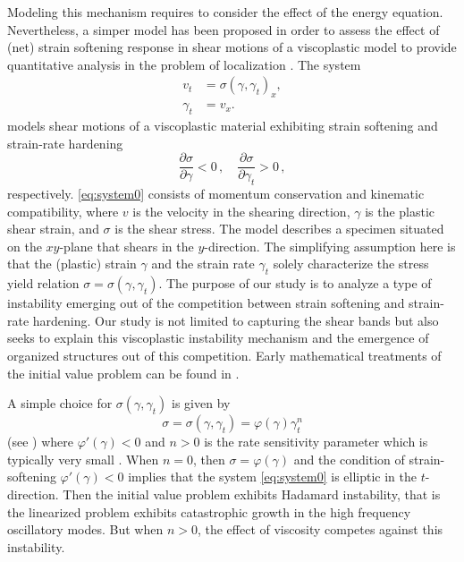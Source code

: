 \documentclass[a4paper,11pt]{article}
\numberwithin{step}{dummy}
\begin{document}
Modeling this mechanism requires to consider the effect of the energy equation. Nevertheless, a simper model has been proposed in order to
assess the effect of (net) strain softening
response in shear motions of a  viscoplastic model  to provide quantitative analysis in the problem of
localization \cite{HN77,tzavaras_plastic_1986,tzavaras_nonlinear_1992}. The system 
\begin{equation} \label{eq:system0}
 \begin{aligned}
   v_t &= \sigma(\gamma,\gamma_t)_x, \\ %
   \gamma_t&=v_x.
 \end{aligned}
\end{equation}
models shear motions of a viscoplastic material exhibiting strain softening  and strain-rate hardening
$$
 \frac{\partial\sigma}{\partial\gamma}<0 \, , \quad   \frac{\partial\sigma}{\partial \gamma_t } > 0 \, , 
$$
respectively. 
\eqref{eq:system0} consists of momentum conservation and kinematic compatibility, where $v$ is the velocity in the shearing direction, 
$\gamma$ is the plastic shear strain,  and $\sigma$ is the shear stress. The model describes a specimen situated on the  $xy$-plane that shears in the $y$-direction. 
The simplifying assumption here is that the (plastic) strain $\gamma$ and the strain rate $\gamma_t$ solely characterize the stress yield relation
$ \sigma = \sigma(\gamma,\gamma_t)$.  The purpose of our study is to analyze a type of instability emerging out of the competition between 
strain softening and strain-rate hardening. Our study is not limited to capturing the shear bands but also seeks to explain this viscoplastic instability mechanism
and the emergence of organized structures out of this competition.
Early mathematical treatments of the initial value problem can be found in \cite{tzavaras_plastic_1986,tzavaras_strain_1991}.

A simple choice for $\sigma(\gamma,\gamma_t)$  is given by 
\begin{equation} \label{eq:constitution1}
 \sigma = \sigma(\gamma,\gamma_t)=\varphi(\gamma)\gamma_t^n
\end{equation}
(see \cite{molinari_analytical_1987, tzavaras_strain_1991}) 
where $\varphi'(\gamma)<0$ and $n>0$ is the rate sensitivity parameter which is typically very small \cite{shawki_shear_1989}. 
When  $n=0$, then $\sigma=\varphi(\gamma)$ and the condition of strain-softening $\varphi'(\gamma)<0$ implies that
the system \eqref{eq:system0} is elliptic in the $t$-direction. Then the initial value problem exhibits
 Hadamard instability, that is the linearized problem exhibits catastrophic growth in the high frequency oscillatory modes.  
 But when  $n > 0$, the  effect of viscosity  competes against this instability.
\end{document}
